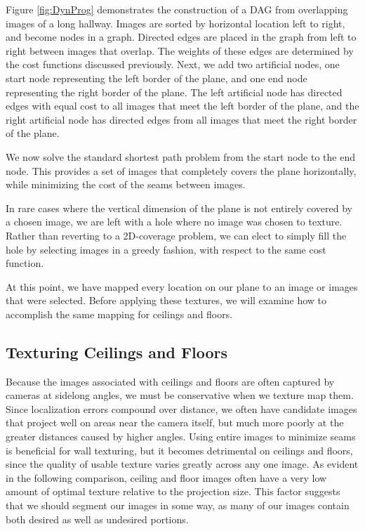 \documentclass[10pt,twocolumn,letterpaper]{article}
\begin{document}
Figure \ref{fig:DynProg} demonstrates the construction of a DAG from
overlapping images of a long hallway. Images are sorted by horizontal
location left to right, and become nodes in a graph. Directed edges
are placed in the graph from left to right between images that
overlap. The weights of these edges are determined by the cost
functions discussed previously. Next, we add two artificial nodes, one
start node representing the left border of the plane, and one end node
representing the right border of the plane. The left artificial node
has directed edges with equal cost to all images that meet the left
border of the plane, and the right artificial node has directed edges
from all images that meet the right border of the plane.

We now solve the standard shortest path problem from the start node to
the end node. This provides a set of images that completely covers the
plane horizontally, while minimizing the cost of the seams between
images.

In rare cases where the vertical dimension of the plane is not
entirely covered by a chosen image, we are left with a hole where no
image was chosen to texture. Rather than reverting to a 2D-coverage
problem, we can elect to simply fill the hole by selecting images in a
greedy fashion, with respect to the same cost function.

At this point, we have mapped every location on our plane to an image
or images that were selected. Before applying these textures, we will
examine how to accomplish the same mapping for ceilings and floors.

\subsection{Texturing Ceilings and Floors}

Because the images associated with ceilings and floors are often
captured by cameras at sidelong angles, we must be conservative when
we texture map them. Since localization errors compound over distance,
we often have candidate images that project well on areas near the
camera itself, but much more poorly at the greater distances caused by
higher angles. Using entire images to minimize seams is beneficial for
wall texturing, but it becomes detrimental on ceilings and floors,
since the quality of usable texture varies greatly across any one
image. As evident in the following comparison, ceiling and floor
images often have a very low amount of optimal texture relative to the
projection size. This factor suggests that we should segment our
images in some way, as many of our images contain both desired as well
as undesired portions.
\end{document}

